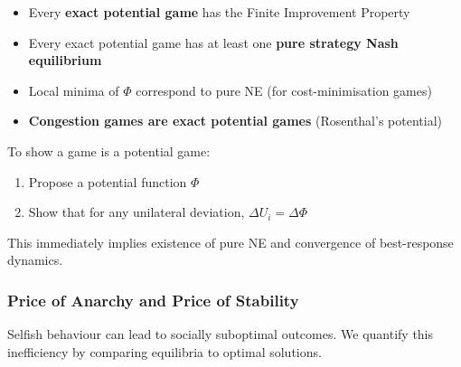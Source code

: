 \begin{defbox}
\begin{itemize}
  \item Every \textbf{exact potential game} has the Finite Improvement Property
  \item Every exact potential game has at least one \textbf{pure strategy Nash equilibrium}
  \item Local minima of $\Phi$ correspond to pure NE (for cost-minimisation games)
  \item \textbf{Congestion games are exact potential games} (Rosenthal's potential)
\end{itemize}
\end{defbox}

\begin{tipbox}
To show a game is a potential game:
\begin{enumerate}
  \item Propose a potential function $\Phi$
  \item Show that for any unilateral deviation, $\Delta U_i = \Delta \Phi$
\end{enumerate}
This immediately implies existence of pure NE and convergence of best-response dynamics.
\end{tipbox}

\bigseparator

\subsubsection{Price of Anarchy and Price of Stability}

\begin{defbox}
Selfish behaviour can lead to socially suboptimal outcomes. We quantify this inefficiency by comparing equilibria to optimal solutions.
\end{defbox}


